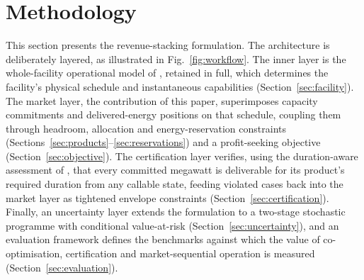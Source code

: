 \documentclass[lettersize,journal]{IEEEtran}
\begin{document}
\section{Methodology}\label{sec:methodology}

This section presents the revenue-stacking formulation. The architecture is deliberately layered, as illustrated in Fig.~\ref{fig:workflow}. The inner layer is the whole-facility operational model of \cite{takci2026characterisation}, retained in full, which determines the facility's physical schedule and instantaneous capabilities (Section~\ref{sec:facility}). The market layer, the contribution of this paper, superimposes capacity commitments and delivered-energy positions on that schedule, coupling them through headroom, allocation and energy-reservation constraints (Sections~\ref{sec:products}--\ref{sec:reservations}) and a profit-seeking objective (Section~\ref{sec:objective}). The certification layer verifies, using the duration-aware assessment of \cite{takci2026characterisation}, that every committed megawatt is deliverable for its product's required duration from any callable state, feeding violated cases back into the market layer as tightened envelope constraints (Section~\ref{sec:certification}). Finally, an uncertainty layer extends the formulation to a two-stage stochastic programme with conditional value-at-risk (Section~\ref{sec:uncertainty}), and an evaluation framework defines the benchmarks against which the value of co-optimisation, certification and market-sequential operation is measured (Section~\ref{sec:evaluation}).
\end{document}
